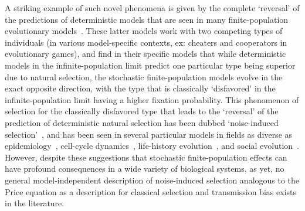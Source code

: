 A striking example of such novel phenomena is given by the complete `reversal' of the predictions of deterministic models that are seen in many finite-population evolutionary models~\citep{houchmandzadeh_selection_2012,houchmandzadeh_fluctuation_2015,constable_demographic_2016,mcleod_social_2019}. These latter models work with two competing types of individuals (in various model-specific contexts, ex: cheaters and cooperators in evolutionary games), and find in their specific models that while deterministic models in the infinite-population limit predict one particular type being superior due to natural selection, the stochastic finite-population models evolve in the exact opposite direction, with the type that is classically `disfavored' in the infinite-population limit having a higher fixation probability. This phenomenon of selection for the classically disfavored type that leads to the `reversal' of the prediction of deterministic natural selection has been dubbed `noise-induced selection'~\citep{constable_demographic_2016,mcleod_social_2019,week_white_2021}, and has been seen in several particular models in fields as diverse as epidemiology~\citep{kogan_two-strain_2014,humplik_evolutionary_2014,parsons_pathogen_2018,day_price_2020}, cell-cycle dynamics~\citep{wodarz_effect_2017}, life-history evolution~\citep{gillespie_natural_1974,veller_drift-induced_2017,kuosmanen_turnover_2022}, and social evolution~\citep{houchmandzadeh_selection_2012,houchmandzadeh_fluctuation_2015,chotibut_evolutionary_2015,constable_demographic_2016,mcleod_social_2019,wang_reproductive_2023}. However, despite these suggestions that stochastic finite-population effects can have profound consequences in a wide variety of biological systems, as yet, no general model-independent description of noise-induced selection analogous to the Price equation as a description for classical selection and transmission bias exists in the literature.

